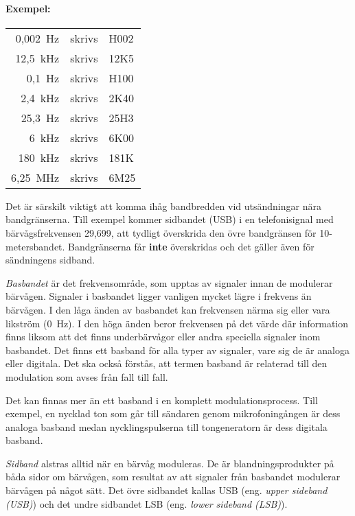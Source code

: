 \paragraph{Exempel:}

\begin{center}
\begin{tabular}{rll}
	0,002~Hz & skrivs & H002 \\
	12,5~kHz & skrivs & 12K5 \\
	0,1~Hz   & skrivs & H100 \\
	2,4~kHz  & skrivs & 2K40 \\
	25,3~Hz  & skrivs & 25H3 \\
	6~kHz    & skrivs & 6K00 \\
	180~kHz  & skrivs & 181K \\
	6,25~MHz & skrivs & 6M25 \\
\end{tabular}
\end{center}

Det är särskilt viktigt att komma ihåg bandbredden vid utsändningar nära
bandgränserna.
Till exempel kommer sidbandet (USB) i en telefonisignal med bärvågsfrekvensen 29,699,
att tydligt överskrida den övre bandgränsen för 10-metersbandet.
Bandgränserna får \textbf{inte} överskridas och det gäller även för sändningens
sidband.

\emph{Basbandet} är det frekvensområde, som upptas av signaler innan de
modulerar bärvågen.
Signaler i basbandet ligger vanligen mycket lägre i frekvens än bärvågen.
I den låga änden av basbandet kan frekvensen närma sig eller vara likström
(0~Hz).
I den höga änden beror frekvensen på det värde där information finns liksom att
det finns underbärvågor eller andra speciella signaler inom basbandet.
Det finns ett basband för alla typer av signaler, vare sig de är analoga eller
digitala.
Det ska också förstås, att termen basband är relaterad till den modulation som
avses från fall till fall.

Det kan finnas mer än ett basband i en komplett modulationsprocess.
Till exempel, en nycklad ton som går till sändaren genom mikrofoningången är
dess analoga basband medan nycklingspulserna till tongeneratorn är dess digitala
basband.

\emph{Sidband} alstras alltid när en bärvåg moduleras.
De är blandningsprodukter på båda sidor om bärvågen, som resultat av att
signaler från basbandet modulerar bärvågen på något sätt.
Det övre sidbandet kallas USB (eng. \emph{upper sideband (USB)})
och det undre sidbandet LSB (eng. \emph{lower sideband (LSB)}).

